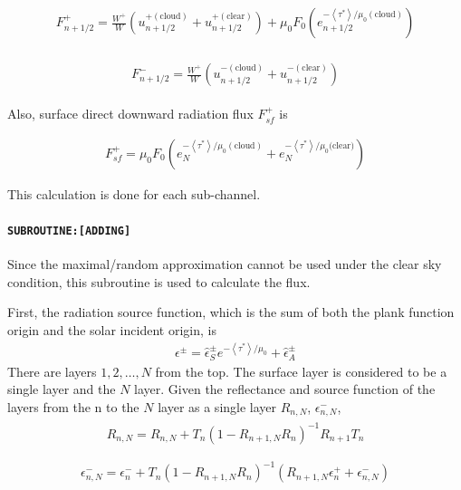 \begin{eqnarray}
\begin{array}{c}
F_{n+1 / 2}^{+}=\frac{W^{+}}{W}\left(u_{n+1 / 2}^{+(\text{cloud})}+u_{n+1 / 2}^{+(\text{clear})}\right)+\mu_{0} F_{0}\left(e_{n+1 / 2}^{-\left\langle\tau^{*}\right\rangle / \mu_{0}(\text {cloud})}\right)
\end{array}
\end{eqnarray}

\begin{eqnarray}
\begin{array}{c}
F_{n+1 / 2}^{-}=\frac{W^{+}}{W}\left(u_{n+1 / 2}^{-(\text{cloud})}+u_{n+1 / 2}^{-(\text {clear})}\right)
\end{array}
\end{eqnarray}

Also, surface direct downward radiation flux \(F_{s f}^{+}\) is

\begin{eqnarray}
F_{s f}^{+}=\mu_{0} F_{0}\left(e_{N}^{-\left\langle\tau^{*}\right\rangle / \mu_{0}(\text {cloud})}+e_{N}^{-\left\langle\tau^{*}\right\rangle / \mu_{0} \text{(clear)}}\right)
\end{eqnarray}

This calculation is done for each sub-channel.

\hypertarget{subroutineadding}{%
\paragraph{\texorpdfstring{\texttt{SUBROUTINE:{[}ADDING{]}}}{SUBROUTINE:{[}ADDING{]}}}\label{subroutineadding}}

Since the maximal/random approximation cannot be used under the clear
sky condition, this subroutine is used to calculate the flux.

First, the radiation source function, which is the sum of both the plank
function origin and the solar incident origin, is \begin{eqnarray}
\epsilon^{\pm}=\hat{\epsilon}_{S}^{\pm} e^{-\left\langle\tau^{*}\right\rangle / \mu_{0}}+\hat{\epsilon}_{A}^{\pm}
\end{eqnarray} There are layers \(1, 2,\dots, N\) from the top. The surface layer is
considered to be a single layer and the \(N\) layer. Given the
reflectance and source function of the layers from the n to the \(N\)
layer as a single layer \(R_{n, N}\), \(\epsilon_{n, N}^{-}\), \begin{eqnarray}
\begin{array}{c}
R_{n, N}=R_{n, N}+T_{n}\left(1-R_{n+1, N} R_{n}\right)^{-1} R_{n+1} T_{n} \\
\end{array}
\end{eqnarray} \begin{eqnarray}
\begin{array}{c}
\epsilon_{n, N}^{-}=\epsilon_{n}^{-}+T_{n}\left(1-R_{n+1, N} R_{n}\right)^{-1}\left(R_{n+1, N} \epsilon_{n}^{+}+\epsilon_{n, N}^{-}\right)
\end{array}
\end{eqnarray}

